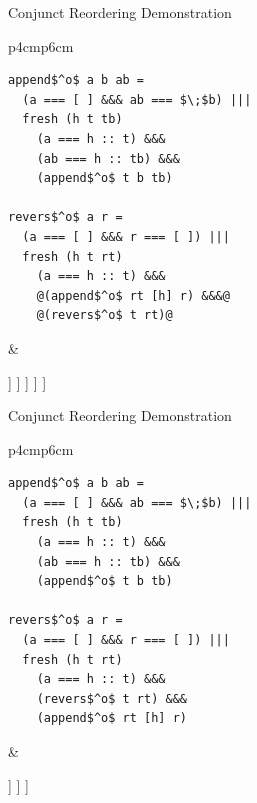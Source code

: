 \documentclass{beamer}
\theoremstyle{definition}
\theoremstyle{plain} %
\begin{document}
\begin{frame}[fragile]{Conjunct Reordering Demonstration}
  \begin{tabular}{p{4cm}p{6cm}}
    \begin{lstlisting}
append$^o$ a b ab =		
  (a === [ ] &&& ab === $\;$b) |||
  fresh (h t tb) 
    (a === h :: t) &&&
    (ab === h :: tb) &&&
    (append$^o$ t b tb) 
  
revers$^o$ a r =	
  (a === [ ] &&& r === [ ]) |||
  fresh (h t rt) 
    (a === h :: t) &&&
    @(append$^o$ rt [h] r) &&&@
    @(revers$^o$ t rt)@
\end{lstlisting}
&
\begin{center}
 \Tree [.{\lstinline|revers$^o\; [1,\,2,\,3]\; r$|}
    [.{$[1,\,2,\,3]\not\equiv [\;]$} ]
    [.{$[1,\,2,\,3]\equiv h_0::t_0$}
      [.{\lstinline|append$^o\;rt_0\;[1]\;r$|}
        [.{$\dots$} ]
        [.{$rt_0\equiv h_1::t_1$} [.{$r\equiv h_1::tb_0$} [.{\lstinline|append$^o\;t_1\;[1]\;tb_0$|} ] ] ]
      ]
    ]
  ]
\end{center}
\end{tabular}
\end{frame}

\begin{frame}[fragile]{Conjunct Reordering Demonstration}
  \begin{tabular}{p{4cm}p{6cm}}
    \begin{lstlisting}
append$^o$ a b ab =		
  (a === [ ] &&& ab === $\;$b) |||
  fresh (h t tb) 
    (a === h :: t) &&&
    (ab === h :: tb) &&&
    (append$^o$ t b tb) 
  
revers$^o$ a r =	
  (a === [ ] &&& r === [ ]) |||
  fresh (h t rt) 
    (a === h :: t) &&&
    (revers$^o$ t rt) &&&
    (append$^o$ rt [h] r)
\end{lstlisting}
&
\begin{center}
 \Tree [.{\lstinline|revers$^o\; [1,\,2,\,3]\; r$|}
    [.{$[1,\,2,\,3]\not\equiv [\;]$} ]
    [.{$[1,\,2,\,3]\equiv h_0::t_0$}
      [.{\lstinline|revers$^o\;[2,\,3]\;rt_0$|}
        [.{$\dots$} ]
      ]
    ]
  ]
\end{center}
\end{tabular}
\end{frame}
\end{document}
